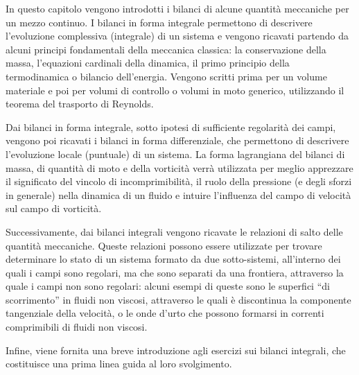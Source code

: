 

In questo capitolo vengono introdotti i bilanci di alcune quantità meccaniche per un mezzo continuo. I bilanci in forma integrale permettono di descrivere l'evoluzione complessiva (integrale) di un sistema e vengono ricavati partendo da alcuni principi fondamentali della meccanica classica: la conservazione della massa, l'equazioni cardinali della dinamica, il primo principio della termodinamica o bilancio dell'energia. Vengono scritti prima per un volume materiale e poi per volumi di controllo o volumi in moto generico, utilizzando il teorema del trasporto di Reynolds.

\noindent
Dai bilanci in forma integrale, sotto ipotesi di sufficiente regolarità dei campi, vengono poi ricavati i bilanci in forma differenziale, che permettono di descrivere l'evoluzione locale (puntuale) di un sistema. La forma lagrangiana del bilanci di massa, di quantità di moto e della vorticità verrà utilizzata per meglio apprezzare il significato del vincolo di incomprimibilità, il ruolo della pressione (e degli sforzi in generale) nella dinamica di un fluido e intuire l'influenza del campo di velocità sul campo di vorticità.

\noindent
Successivamente, dai bilanci integrali vengono ricavate le relazioni di salto delle quantità meccaniche. Queste relazioni possono essere utilizzate per trovare determinare lo stato di un sistema formato da due sotto-sistemi, all'interno dei quali i campi sono regolari, ma che sono separati da una frontiera, attraverso la quale i campi non sono regolari: alcuni esempi di queste sono le superfici ``di scorrimento'' in fluidi non viscosi, attraverso le quali è discontinua la componente tangenziale della velocità, o le onde d'urto che possono formarsi in correnti comprimibili di fluidi non viscosi.

\noindent
Infine, viene fornita una breve introduzione agli esercizi sui bilanci integrali, che costituisce una prima linea guida al loro svolgimento.



